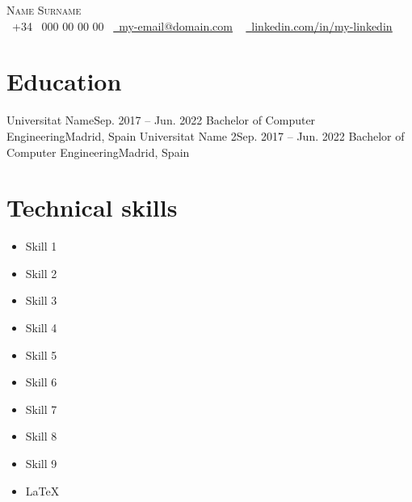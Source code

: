 


\def\name{Name}
\def\surname{Surname}
\def\phonePrefix{34}
\def\phone{000 00 00 00}
\def\email{\ul{my-email@domain.com}}
\def\linkedin{\ul{linkedin.com/in/my-linkedin}}
\def\personalPage{\ul{my-personal-page.com}} %





	\begin{center}
		{\Huge \scshape {\color{nameColor}\name} \surname} \\ \vspace{1pt}
		\vspace{0.4cm}
		\small \raisebox{-0.1\height}{\color{symbolsColor}{\faPhone}}\ +\phonePrefix ~ \phone ~ \href{mailto:email@mail.com}{\raisebox{-0.2\height}{\color{symbolsColor}{\faEnvelope}}\  {\email}} ~ 
		\href{https://linkedin.com/in//}{\raisebox{-0.2\height}{\color{symbolsColor}{\faLinkedin}}\ {\linkedin}}  ~
		\vspace{0.2cm}
	\end{center}

	\section{Education}
	\resumeSubHeadingListStart
		\resumeSubheading
			{Universitat Name}{Sep. 2017 -- Jun. 2022}
			{Bachelor of Computer Engineering}{Madrid, Spain}
		\resumeSubheading
			{Universitat Name 2}{Sep. 2017 -- Jun. 2022}
			{Bachelor of Computer Engineering}{Madrid, Spain}
	\resumeSubHeadingListEnd
	
	\section{Technical skills}
	\begin{multicols}{2}
	\begin{itemize}[itemsep=1pt, parsep=3pt]
		\item Skill 1
		\item Skill 2
		\item Skill 3
		\item Skill 4
		\item Skill 5
		\item Skill 6
		\item Skill 7
		\item Skill 8
		\item Skill 9
		\item \LaTeX
	\end{itemize}
	\end{multicols}
	
